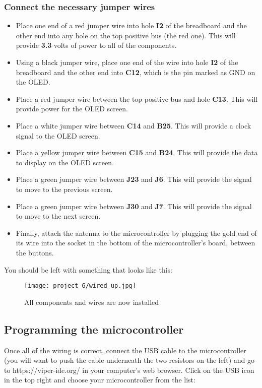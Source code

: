 \subsubsection{Connect the necessary jumper wires}
\begin{itemize}
    \item Place one end of a red jumper wire into hole \textbf{I2} of the breadboard and the other end into
    any hole on the top positive bus (the red one). This will provide \textbf{3.3} volts of power to all of the components.
    \item Using a black jumper wire, place one end of the wire into hole \textbf{I2} of the breadboard and the other
    end into \textbf{C12}, which is the pin marked as GND on the OLED.
    \item Place a red jumper wire between the top positive bus and hole \textbf{C13}. This will provide power for the OLED screen.
    \item Place a white jumper wire between \textbf{C14} and \textbf{B25}. This will provide a clock signal to the OLED screen.
    \item Place a yellow jumper wire between \textbf{C15} and \textbf{B24}. This will provide the data to display on the OLED screen.
    \item Place a green jumper wire between \textbf{J23} and \textbf{J6}. This will provide the signal to move to the previous screen.
    \item Place a green jumper wire between \textbf{J30} and \textbf{J7}. This will provide the signal to move to the next screen.
    \item Finally, attach the antenna to the microcontroller by plugging the gold end of its wire into the socket in the bottom of
    the microcontroller's board, between the buttons.
\end{itemize}

You should be left with something that looks like this:
\begin{figure}[H]
    \centering
    \texttt{[image: project\_6/wired\_up.jpg]}
    \caption{All components and wires are now installed}
\end{figure}

\subsection{Programming the microcontroller}
Once all of the wiring is correct, connect the USB cable to the microcontroller (you will want to push the cable underneath the
two resistors on the left) and go to https://viper-ide.org/ in your computer's web browser. Click on the USB icon in the top
right and choose your microcontroller from the list:

